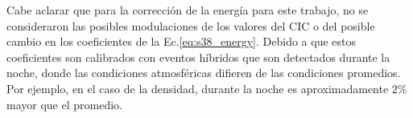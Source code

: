 Cabe aclarar que para la corrección de la energía para este trabajo, no se consideraron las posibles modulaciones de los valores del CIC o del posible cambio en los coeficientes de la Ec.\ref{eq:s38_energy}. Debido a que estos coeficientes son calibrados con eventos híbridos que son detectados durante la noche, donde las condiciones atmosféricas difieren de las condiciones promedios. Por ejemplo, en el caso de la densidad, durante la noche es aproximadamente $2\%$ mayor que el promedio.
